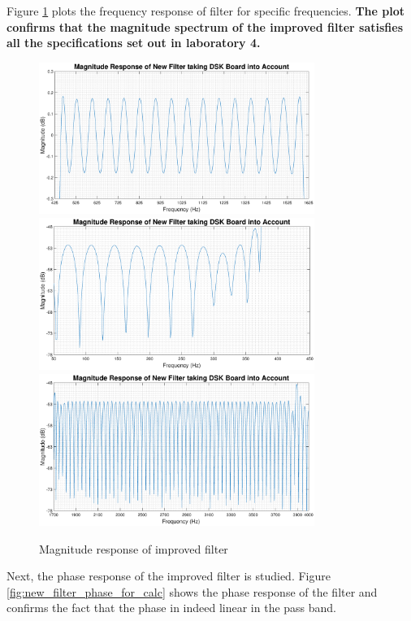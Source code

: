\documentclass{article}
\begin{document}
Figure \ref{fig:new_filter_zoom} plots the frequency response of filter for specific frequencies. \textbf{The plot confirms that the magnitude spectrum of the improved filter satisfies all the specifications set out in laboratory 4.}

\begin{figure}[H]
    \centering
    \includegraphics[width=0.8\textwidth]{dsk_mag_new_filter_after_subtracting_passband_zoom}
    \includegraphics[width=0.8\textwidth]{dsk_mag_new_filter_after_subtracting_stopband_1_zoom}
    \includegraphics[width=0.8\textwidth]{dsk_mag_new_filter_after_subtracting_stopband_2_zoom}
    \caption{Magnitude response of improved filter}
    \label{fig:new_filter_zoom}
\end{figure}

\newpage
Next, the phase response of the improved filter is studied. Figure \ref{fig:new_filter_phase_for_calc} shows the phase response of the filter and confirms the fact that the phase in indeed linear in the pass band. 
\end{document}
